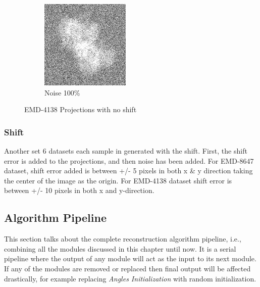 \documentclass[twoside]{iitbreport}
\begin{document}
\begin{figure}[h]
\begin{subfigure}{.28\textwidth}
\includegraphics[width=0.8\linewidth]{Emd_4138_proj1_noise_100.jpg}
\captionsetup{justification=centering}
\caption{ Noise 100\%}
\end{subfigure}
\caption{EMD-4138 Projections with no shift}
\label{fig:EMD-4138 Projections: Noisy}
\end{figure}

\subsubsection{Shift}

Another set 6 datasets each sample in generated with the shift. First, the shift error is added to the projections, and then noise has been added. For EMD-8647 dataset, shift error added is between +/- 5 pixels in both x \& y direction taking the center of the image as the origin. For EMD-4138 dataset shift error is between +/-  10 pixels in both x and y-direction.

\subsection{Algorithm Pipeline}

This section talks about the complete reconstruction algorithm pipeline, i.e., combining all the modules discussed in this chapter until now. It is a serial pipeline where the output of any module will act as the input to its next module. If any of the modules are removed or replaced then final output will be affected drastically, for example replacing \textit{Angles Initialization} with random initialization.  
\end{document}
